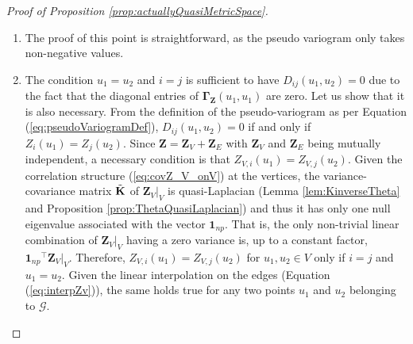 \documentclass[12pt]{article}
\theoremstyle{plain}
\theoremstyle{remark}
\newcommand{\round}[1]{\left( #1 \right)}
\newcommand{\Cov}[2]{\mathbb{C}{\rm ov}\round{#1,#2}}
\newcommand{\onenp}[0]{{\mathbf{1}_{np}}}
\newcommand{\ie}{\textit{i.e. }}
\newcommand{\latMatr}[1]{\mathbf{#1}}          %
\newcommand{\grMatr}[1]{{\boldsymbol{#1}}}   %
\newcommand{\rVec}[1]{{\bm{#1}}}            %
\DeclareMathOperator{\Var}{\mathbb{V}ar}
\begin{document}
    
    
    \begin{proof}[Proof of Proposition \ref{prop:actuallyQuasiMetricSpace}]
        \begin{enumerate}
            \item The proof of this point is straightforward, as the pseudo variogram only takes non-negative values.
            \item {The condition $u_1 = u_2$ and $i=j$ is sufficient to have $D_{ij}(u_1,u_2)=0$ due to the fact that the diagonal entries of $\grMatr{\Gamma}_{{\rVec{Z}}}(u_1,u_1)$ are zero. %
            Let us show that it is also necessary. From the definition of the pseudo-variogram as per Equation (\ref{eq:pseudoVariogramDef}), $D_{ij}(u_1,u_2) = 0$ if and only if $Z_i(u_1) = Z_j(u_2)$. Since $\rVec{Z} = \rVec{Z}_V+\rVec{Z}_E$ with $\rVec{Z}_V$ and $\rVec{Z}_E$ being mutually independent, a necessary condition 
            is that $Z_{V,i}(u_1) = Z_{V,j}(u_2)$. Given the correlation structure (\ref{eq:covZ_V_onV}) at the vertices, the variance-covariance matrix $\Tilde{\latMatr{K}}$ of $\rVec{Z}_V\big|_V$ is quasi-Laplacian (Lemma \ref{lem:KinverseTheta} and Proposition \ref{prop:ThetaQuasiLaplacian}) and thus it has only one null eigenvalue associated with the vector $\onenp$. That is, the only non-trivial linear combination of $\rVec{Z}_V\big|_V$ having a zero variance is, up to a constant factor, $\onenp^\top \rVec{Z}_V\big|_V$. Therefore, $Z_{V,i}(u_1) = Z_{V,j}(u_2)$ for $u_1, u_2 \in V$ only if $i=j$ and $u_1=u_2$. Given the linear interpolation on the edges (Equation (\ref{eq:interpZv})), the same holds true for any two points $u_1$ and $u_2$ belonging to $\mathcal G$.  %
}
\end{enumerate}
\end{proof}
\end{document}
